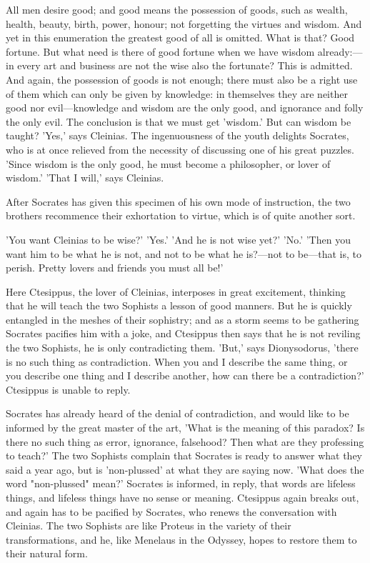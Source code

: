 \documentclass[11pt,letter]{article}
\begin{document}
\par  All men desire good; and good means the possession of goods, such as wealth, health, beauty, birth, power, honour; not forgetting the virtues and wisdom. And yet in this enumeration the greatest good of all is omitted. What is that? Good fortune. But what need is there of good fortune when we have wisdom already:—in every art and business are not the wise also the fortunate? This is admitted. And again, the possession of goods is not enough; there must also be a right use of them which can only be given by knowledge: in themselves they are neither good nor evil—knowledge and wisdom are the only good, and ignorance and folly the only evil. The conclusion is that we must get 'wisdom.' But can wisdom be taught? 'Yes,' says Cleinias. The ingenuousness of the youth delights Socrates, who is at once relieved from the necessity of discussing one of his great puzzles. 'Since wisdom is the only good, he must become a philosopher, or lover of wisdom.' 'That I will,' says Cleinias.

\par  After Socrates has given this specimen of his own mode of instruction, the two brothers recommence their exhortation to virtue, which is of quite another sort.

\par  'You want Cleinias to be wise?' 'Yes.' 'And he is not wise yet?' 'No.' 'Then you want him to be what he is not, and not to be what he is?—not to be—that is, to perish. Pretty lovers and friends you must all be!'

\par  Here Ctesippus, the lover of Cleinias, interposes in great excitement, thinking that he will teach the two Sophists a lesson of good manners. But he is quickly entangled in the meshes of their sophistry; and as a storm seems to be gathering Socrates pacifies him with a joke, and Ctesippus then says that he is not reviling the two Sophists, he is only contradicting them. 'But,' says Dionysodorus, 'there is no such thing as contradiction. When you and I describe the same thing, or you describe one thing and I describe another, how can there be a contradiction?' Ctesippus is unable to reply.

\par  Socrates has already heard of the denial of contradiction, and would like to be informed by the great master of the art, 'What is the meaning of this paradox? Is there no such thing as error, ignorance, falsehood? Then what are they professing to teach?' The two Sophists complain that Socrates is ready to answer what they said a year ago, but is 'non-plussed' at what they are saying now. 'What does the word "non-plussed" mean?' Socrates is informed, in reply, that words are lifeless things, and lifeless things have no sense or meaning. Ctesippus again breaks out, and again has to be pacified by Socrates, who renews the conversation with Cleinias. The two Sophists are like Proteus in the variety of their transformations, and he, like Menelaus in the Odyssey, hopes to restore them to their natural form.
\end{document}
